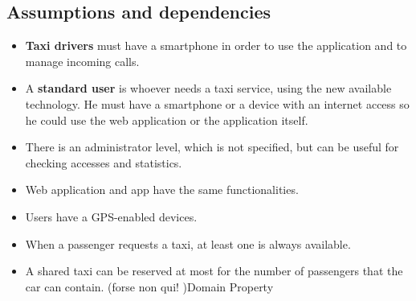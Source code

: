 \subsection{Assumptions and dependencies}
\begin{itemize}
\item \textbf{Taxi drivers} must have a smartphone in order to use the application and to manage incoming calls.
\item A \textbf{standard user} is whoever needs a taxi service, using the new available technology. He must have a smartphone or a device with an internet access so he could use the web application or the application itself.
\item There is an administrator level, which is not specified, but can be useful for checking accesses and statistics.
\item Web application and app have the same functionalities.
\item Users have a GPS-enabled devices.
\item When a passenger requests a taxi, at least one is always available.
\item A shared taxi can be reserved at most for the number of passengers that the car can contain. (forse non qui! )Domain Property
\end{itemize}